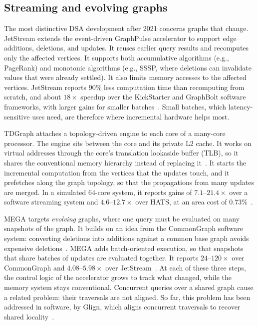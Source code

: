 \documentclass[journal,onecolumn]{IEEEtran}
\begin{document}
\subsection{Streaming and evolving graphs}
The most distinctive DSA development after 2021 concerns graphs that change. JetStream extends the event-driven GraphPulse accelerator to support edge additions, deletions, and updates. It reuses earlier query results and recomputes only the affected vertices. It supports both accumulative algorithms (e.g., PageRank) and monotonic algorithms (e.g., SSSP, where deletions can invalidate values that were already settled). It also limits memory accesses to the affected vertices. JetStream reports 90\% less computation time than recomputing from scratch, and about $18\times$ speedup over the KickStarter and GraphBolt software frameworks, with larger gains for smaller batches~\cite{rahman2021jetstream}. Small batches, which latency-sensitive uses need, are therefore where incremental hardware helps most.

TDGraph attaches a topology-driven engine to each core of a many-core processor. The engine sits between the core and its private L2 cache. It works on virtual addresses through the core's translation lookaside buffer (TLB), so it shares the conventional memory hierarchy instead of replacing it~\cite{zhao2022tdgraph}. It starts the incremental computation from the vertices that the updates touch, and it prefetches along the graph topology, so that the propagations from many updates are merged. In a simulated 64-core system, it reports gains of $7.1$--$21.4\times$ over a software streaming system and $4.6$--$12.7\times$ over HATS, at an area cost of 0.73\%~\cite{zhao2022tdgraph}.

MEGA targets \emph{evolving} graphs, where one query must be evaluated on many snapshots of the graph. It builds on an idea from the CommonGraph software system: converting deletions into additions against a common base graph avoids expensive deletions~\cite{afarin2023commongraph}. MEGA adds batch-oriented execution, so that snapshots that share batches of updates are evaluated together. It reports $24$--$120\times$ over CommonGraph and $4.08$--$5.98\times$ over JetStream~\cite{gao2023mega}. At each of these three steps, the control logic of the accelerator grows to track what changed, while the memory system stays conventional. Concurrent queries over a shared graph cause a related problem: their traversals are not aligned. So far, this problem has been addressed in software, by Glign, which aligns concurrent traversals to recover shared locality~\cite{yin2023glign}.
\end{document}
